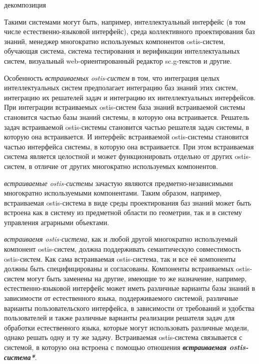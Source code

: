 \begin{SCn}
	\begin{scnrelfromset}{декомпозиция}
	\end{scnrelfromset}
\end{SCn}

Такими системами могут быть, например, интеллектуальный интерфейс (в том числе естественно-языковой интерфейс), среда коллективного проектирования баз знаний, менеджер многократно используемых компонентов ostis-систем, обучающая система, система тестирования и верификации интеллектуальных систем, визуальный web-ориентированный редактор sc.g-текстов и другие.

Особенность \textit{встраиваемых ostis-систем} в том, что интеграция целых интеллектуальных систем предполагает интеграцию баз знаний этих систем, интеграцию их решателей задач и интеграцию их интеллектуальных интерфейсов. При интеграции встраиваемых ostis-систем база знаний встраиваемой системы становится частью базы знаний системы, в которую она встраивается. Решатель задач встраиваемой ostis-системы становится частью решателя задач системы, в которую она встраивается. И интерфейс встраиваемой ostis-системы становится частью интерфейса системы, в которую она встраивается. При этом встраиваемая система является целостной и может функционировать отдельно от других ostis-систем, в отличие от других многократно используемых компонентов.

\textit{встраиваемые ostis-системы} зачастую являются предметно-независимыми многократно используемыми компонентами. Таким образом, например, встраиваемая ostis-система в виде среды проектирования баз знаний может быть встроена как в систему из предметной области по геометрии, так и в систему управления аграрными объектами.

\textit{встраиваемя ostis-система}, как и любой другой многократно используемый компонент ostis-систем, должна поддерживать семантическую совместимость ostis-систем. Как сама встраиваемая ostis-система, так и все её компоненты должны быть специфицированы и согласованы. Компоненты встраиваемых ostis-систем могут быть заменены на другие, имеющие то же назначение, например, естественно-языковой интерфейс может иметь различные варианты базы знаний в зависимости от естественного языка, поддерживаемого системой, различные варианты пользовательского интерфейса, в зависимости от требований и удобства пользователей и также различные варианты реализации решателя задач для обработки естественного языка, которые могут использовать различные модели, однако решать одну и ту же задачу. Встраиваемая ostis-система связывается с системой, в которую она встроена с помощью отношения \textbf{\textit{встраиваемая ostis-система*}}.


